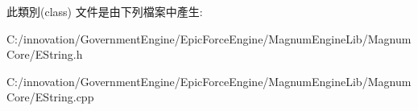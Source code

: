 此類別(class) 文件是由下列檔案中產生\+:\begin{DoxyCompactItemize}
\item 
C\+:/innovation/\+Government\+Engine/\+Epic\+Force\+Engine/\+Magnum\+Engine\+Lib/\+Magnum\+Core/E\+String.\+h\item 
C\+:/innovation/\+Government\+Engine/\+Epic\+Force\+Engine/\+Magnum\+Engine\+Lib/\+Magnum\+Core/E\+String.\+cpp\end{DoxyCompactItemize}
